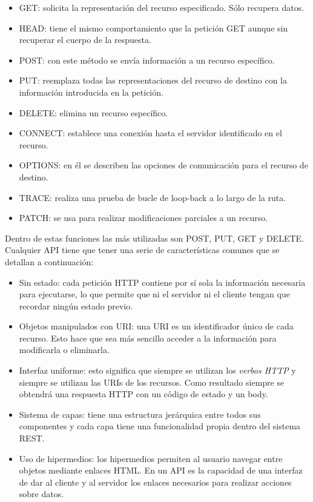 \begin{itemize}
    \item GET: solicita la representación del recurso especificado. Sólo recupera datos.
    \item HEAD: tiene el mismo comportamiento que la petición GET aunque sin recuperar el cuerpo de la respuesta.
    \item POST: con este método se envía información a un recurso específico.
    \item PUT: reemplaza todas las representaciones del recurso de destino con la información introducida en la petición.
    \item DELETE: elimina un recurso específico.
    \item CONNECT: establece una conexión hasta el servidor identificado en el recurso.
    \item OPTIONS: en él se describen las opciones de comunicación para el recurso de destino.
    \item TRACE: realiza una prueba de bucle de loop-back a lo largo de la ruta. 
    \item PATCH: se usa para realizar modificaciones parciales a un recurso.
\end{itemize}

Dentro de estas funciones las más utilizadas son POST, PUT, GET y DELETE. Cualquier API tiene que tener una serie de características comunes que se detallan a continuación:

\begin{itemize}
    \item Sin estado: cada petición HTTP contiene por sí sola la información necesaria para ejecutarse, lo que permite que ni el servidor ni el cliente tengan que recordar ningún estado previo.
    \item Objetos manipulados con URI: una URI es un identificador único de cada recurso. Esto hace que sea más sencillo acceder a la información para modificarla o eliminarla.
    \item Interfaz uniforme: esto significa que siempre se utilizan los \textit{verbos HTTP} y siempre se utilizan las URIs de los recursos. Como resultado siempre se obtendrá una respuesta HTTP con un código de estado y un body.
    \item Sistema de capas: tiene una estructura jerárquica entre todos sus componentes y cada capa tiene una funcionalidad propia dentro del sistema REST. 
    \item Uso de hipermedios: los hipermedios permiten al usuario navegar entre objetos mediante enlaces HTML. En un API es la capacidad de una interfaz de dar al cliente y al servidor los enlaces necesarios para realizar acciones sobre datos.
\end{itemize}

